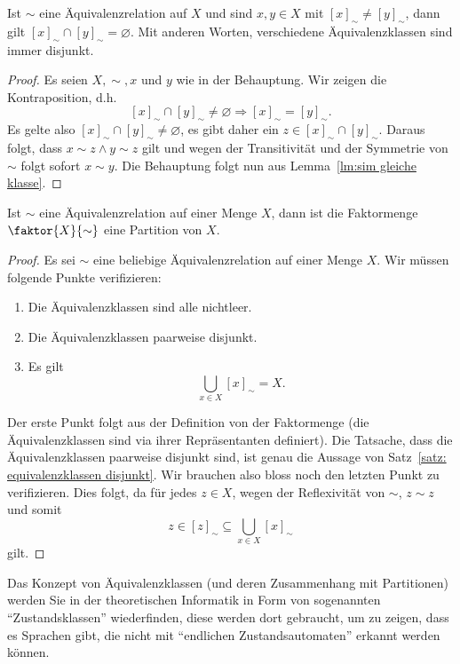 \begin{satz}\label{satz: equivalenzklassen disjunkt}
Ist $\sim $ eine Äquivalenzrelation auf $X$ und sind $x,y\in X$ mit $[x]_\sim\neq[y]_\sim$, dann gilt $[x]_\sim\cap[y]_\sim=\varnothing$.
Mit anderen Worten, verschiedene Äquivalenzklassen sind immer disjunkt.
\end{satz}
\begin{proof}
Es seien $X,\sim,x$ und $y$ wie in der Behauptung. Wir zeigen die Kontraposition, d.h.
\[
[x]_\sim\cap[y]_\sim\neq\varnothing\Rightarrow [x]_\sim=[y]_\sim.
\]
Es gelte also $[x]_\sim\cap[y]_\sim\neq\varnothing$, es gibt daher ein $z\in [x]_\sim\cap[y]_\sim$. Daraus folgt, dass $x\sim z\land y\sim z$ gilt und wegen der Transitivität und der Symmetrie von $\sim$ folgt sofort $x\sim y$. Die Behauptung folgt nun aus Lemma~\ref{lm:sim gleiche klasse}.
\end{proof}


\begin{satz}\label{satz: equivalenzklassen partition}
Ist $\sim$ eine Äquivalenzrelation auf einer Menge $X$, dann ist die Faktormenge $\faktor{X}{\sim}$ eine Partition von $X$.
\end{satz}
\begin{proof}
Es sei $\sim$ eine beliebige Äquivalenzrelation auf einer Menge $X$. Wir müssen folgende Punkte verifizieren:
\begin{enumerate}
\item\label{a} Die Äquivalenzklassen sind alle nichtleer.
\item\label{2} Die Äquivalenzklassen paarweise disjunkt.
\item\label{3} Es gilt
\[
\bigcup_{x\in X}[x]_{\sim}=X.
\]
\end{enumerate}
Der erste Punkt folgt aus der Definition von der Faktormenge (die Äquivalenzklassen sind via ihrer Repräsentanten definiert). Die Tatsache, dass die Äquivalenzklassen paarweise disjunkt sind, ist genau die Aussage von Satz~\ref{satz: equivalenzklassen disjunkt}. Wir brauchen also bloss noch den letzten Punkt zu verifizieren. Dies folgt, da für jedes $z\in X$, wegen der Reflexivität von $\sim$, $z\sim z$ und somit
\[
z\in[z]_\sim\subseteq\bigcup_{x\in X}[x]_\sim
\]
gilt.
\end{proof}

\begin{rk}
	Das Konzept von Äquivalenzklassen (und deren Zusammenhang mit Partitionen) werden Sie in der theoretischen Informatik in Form von sogenannten ``Zustandsklassen'' wiederfinden, diese werden dort gebraucht, um zu zeigen, dass es Sprachen gibt, die nicht mit ``endlichen Zustandsautomaten'' erkannt werden können.
\end{rk}

